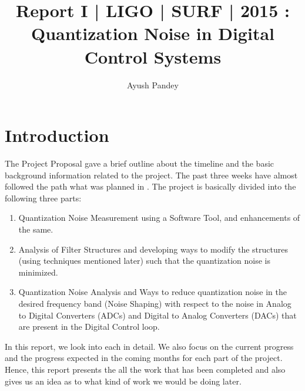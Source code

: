 \documentclass[colorlinks=true,pdfstartview=FitV,linkcolor=blue,
            citecolor=red,urlcolor=magenta]{ligodoc}
\title{Report I | LIGO | SURF | 2015 : Quantization Noise in Digital Control Systems}
\author{Ayush Pandey}
\begin{document}
\section{Introduction}

The Project Proposal\cite{ProjectProposal} gave a brief outline about the timeline and the basic background information related to the project. The past three weeks have almost followed the path what was planned in \cite{ProjectProposal}. The project is basically divided into the following three parts: \\
\begin{enumerate}
\item Quantization Noise Measurement using a Software Tool, and enhancements of the same.
\item Analysis of Filter Structures and developing ways to modify the structures (using techniques mentioned later) such that the quantization noise is minimized.
\item Quantization Noise Analysis and Ways to reduce quantization noise in the desired frequency band (Noise Shaping) with respect to the noise in Analog to Digital Converters (ADCs) and Digital to Analog Converters (DACs) that are present in the Digital Control loop.  

\end{enumerate}

In this report, we look into each in detail. We also focus on the current progress and the progress expected in the coming months for each part of the project. Hence, this report presents the all the work that has been completed and also gives us an idea as to what kind of work we would be doing later.
\end{document}
